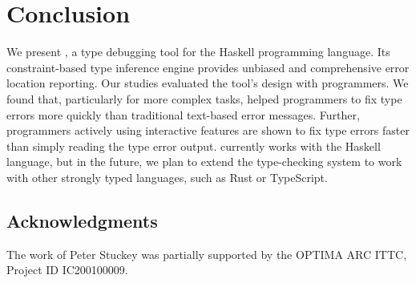 \section{Conclusion}

We present \chameleon{}, a type debugging tool for the Haskell programming language. Its constraint-based type inference engine provides unbiased and comprehensive error location reporting. 
Our studies evaluated the tool's design with programmers. We found that, particularly for more complex tasks, \chameleon{} helped programmers to fix type errors more quickly than traditional text-based error messages. Further, programmers actively using \chameleon{} interactive features are shown to fix type errors faster than simply reading the type error output.
\chameleon{} currently works with the Haskell language, but in the future, we plan to extend the type-checking system to work with other strongly typed languages, such as Rust or TypeScript.

\subsection*{Acknowledgments} 

The work of Peter Stuckey was partially supported by the OPTIMA ARC ITTC, Project ID IC200100009.